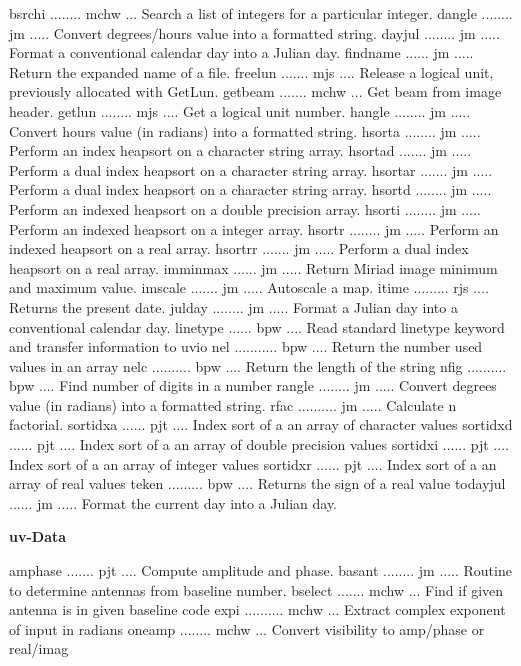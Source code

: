 {\eightpoint\begintt
bsrchi ........ mchw ... Search a list of integers for a particular integer.
dangle ........ jm ..... Convert degrees/hours value into a formatted string.
dayjul ........ jm ..... Format a conventional calendar day into a Julian day.
findname ...... jm ..... Return the expanded name of a file.
freelun ....... mjs .... Release a logical unit, previously allocated with GetLun.
\endtt}
{\eightpoint\begintt
getbeam ....... mchw ... Get beam from image header.
getlun ........ mjs .... Get a logical unit number.
hangle ........ jm ..... Convert hours value (in radians) into a formatted string.
hsorta ........ jm ..... Perform an index heapsort on a character string array.
hsortad ....... jm ..... Perform a dual index heapsort on a character string array.
\endtt}
{\eightpoint\begintt
hsortar ....... jm ..... Perform a dual index heapsort on a character string array.
hsortd ........ jm ..... Perform an indexed heapsort on a double precision array.
hsorti ........ jm ..... Perform an indexed heapsort on a integer array.
hsortr ........ jm ..... Perform an indexed heapsort on a real array.
hsortrr ....... jm ..... Perform a dual index heapsort on a real array.
\endtt}
{\eightpoint\begintt
imminmax ...... jm ..... Return Miriad image minimum and maximum value.
imscale ....... jm ..... Autoscale a map.
itime ......... rjs .... Returns the present date.
julday ........ jm ..... Format a Julian day into a conventional calendar day.
linetype ...... bpw .... Read standard linetype keyword and transfer information to uvio
\endtt}
{\eightpoint\begintt
nel ........... bpw .... Return the number used values in an array
nelc .......... bpw .... Return the length of the string
nfig .......... bpw .... Find number of digits in a number
rangle ........ jm ..... Convert degrees value (in radians) into a formatted string.
rfac .......... jm ..... Calculate n factorial.
\endtt}
{\eightpoint\begintt
sortidxa ...... pjt .... Index sort of a an array of character values
sortidxd ...... pjt .... Index sort of a an array of double precision values
sortidxi ...... pjt .... Index sort of a an array of integer values
sortidxr ...... pjt .... Index sort of a an array of real values
teken ......... bpw .... Returns the sign of a real value
\endtt}
{\eightpoint\begintt
todayjul ...... jm ..... Format the current day into a Julian day.
\endtt}
\par\centerline{\bf uv-Data}
{\eightpoint\begintt
amphase ....... pjt .... Compute amplitude and phase.
basant ........ jm ..... Routine to determine antennas from baseline number.
bselect ....... mchw ... Find if given antenna is in given baseline code
expi .......... mchw ... Extract complex exponent of input in radians
oneamp ........ mchw ... Convert visibility to amp/phase or real/imag
\endtt}
